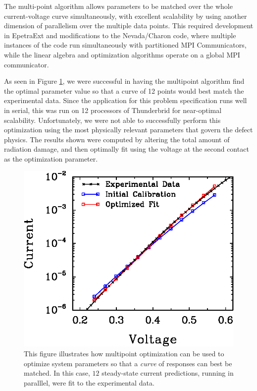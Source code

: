 \documentclass[pdf,ps2pdf,11pt]{SANDreport}
\begin{document}

The multi-point algorithm allows parameters to be matched over the whole
current-voltage curve simultaneously, with excellent scalability by using
another dimension of parallelism over the multiple data points.  This required
development in EpetraExt and modifications to the Nevada/Charon code, where
multiple instances of the code run simultaneously with partitioned MPI
Communicators, while the linear algebra and optimization algorithms operate on
a global MPI communicator.



As seen in Figure {}\ref{fig:multiPointFit}, we were successful in having the
multipoint algorithm find the optimal parameter value so that a curve of 12
points would best match the experimental data. Since the application for this
problem specification runs well in serial, this was run on 12 processors of
Thunderbrid for near-optimal scalability. Unfortunately, we were not able to
successfully perform this optimization using the most physically relevant
parameters that govern the defect physics. The results shown were computed by
altering the total amount of radiation damage, and then optimally fit using
the voltage at the second contact as the optimization parameter.
{\bsinglespace
\begin{figure}
\begin{center}
\includegraphics*[angle=0,scale=0.80,width=0.50\linewidth
]{multiPointFit}
\end{center}
\caption{
\label{fig:multiPointFit}
This figure illustrates how multipoint optimization can be used to optimize
system parameters so that a {\em curve} of responses can best be matched. In
this case, $12$ steady-state current predictions, running in paralllel, were
fit to the experimental data.}
\end{figure}
\esinglespace}
\end{document}
